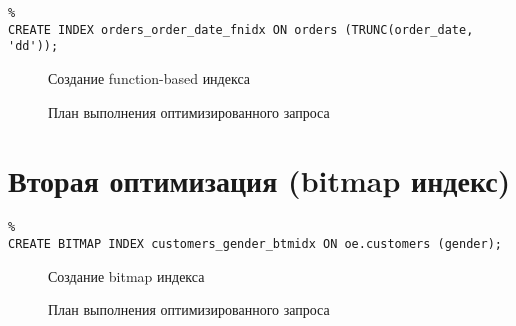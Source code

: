\begin{verbatim}%
CREATE INDEX orders_order_date_fnidx ON orders (TRUNC(order_date, 'dd'));
\end{verbatim}
\begin{figure}[H]%
  \caption{Создание function-based индекса}
  \label{fig-task-1-plan}
\end{figure}


\begin{figure}[H]%
  \caption{План выполнения оптимизированного запроса}
  \label{fig-task-1-function-based-plan}
\end{figure}


\section{Вторая оптимизация (bitmap индекс)}


\begin{verbatim}%
CREATE BITMAP INDEX customers_gender_btmidx ON oe.customers (gender);
\end{verbatim}
\begin{figure}[H]%
  \caption{Создание bitmap индекса}
  \label{fig-task-1-bitmap-plan}
\end{figure}

\begin{figure}[H]%
  \caption{План выполнения оптимизированного запроса}
  \label{fig-task-1-bitmap-plan}
\end{figure}
